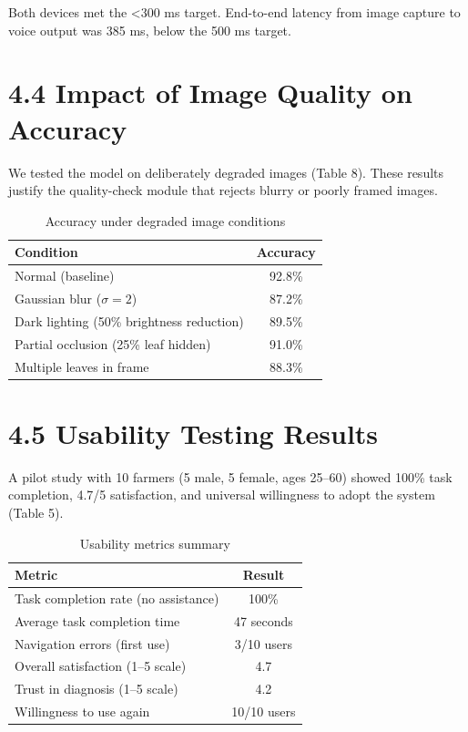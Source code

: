 \documentclass[12pt,letterpaper]{report}
\begin{document}
Both devices met the <300 ms target. End-to-end latency from image capture to voice output was 385 ms, below the 500 ms target.

\section*{4.4 Impact of Image Quality on Accuracy}

We tested the model on deliberately degraded images (Table 8). These results justify the quality-check module that rejects blurry or poorly framed images.

\begin{table}[H]
\centering
\caption{Accuracy under degraded image conditions}
\label{tab:quality}
\begin{tabular}{@{}lc@{}}
\toprule
\textbf{Condition} & \textbf{Accuracy} \\
\midrule
Normal (baseline) & 92.8\% \\
Gaussian blur ($\sigma=2$) & 87.2\% \\
Dark lighting (50\% brightness reduction) & 89.5\% \\
Partial occlusion (25\% leaf hidden) & 91.0\% \\
Multiple leaves in frame & 88.3\% \\
\bottomrule
\end{tabular}
\end{table}

\section*{4.5 Usability Testing Results}

A pilot study with 10 farmers (5 male, 5 female, ages 25–60) showed 100\% task completion, 4.7/5 satisfaction, and universal willingness to adopt the system (Table 5).

\begin{table}[H]
\centering
\caption{Usability metrics summary}
\label{tab:usability}
\begin{tabular}{@{}lc@{}}
\toprule
\textbf{Metric} & \textbf{Result} \\
\midrule
Task completion rate (no assistance) & 100\% \\
Average task completion time & 47 seconds \\
Navigation errors (first use) & 3/10 users \\
Overall satisfaction (1–5 scale) & 4.7 \\
Trust in diagnosis (1–5 scale) & 4.2 \\
Willingness to use again & 10/10 users \\
\bottomrule
\end{tabular}
\end{table}
\end{document}

